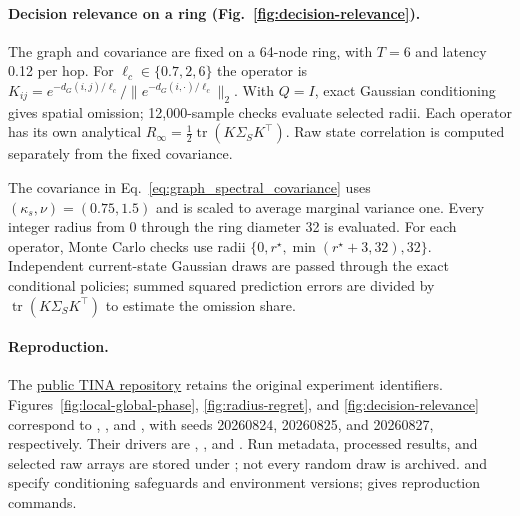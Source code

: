\paragraph{Decision relevance on a ring (Fig.~\ref{fig:decision-relevance}).}
The graph and covariance are fixed on a 64-node ring, with $T=6$ and latency
0.12 per hop. For $\ell_c\in\{0.7,2,6\}$ the operator is
$K_{ij}=e^{-d_G(i,j)/\ell_c}/\|e^{-d_G(i,\cdot)/\ell_c}\|_2$.
With $Q=I$, exact Gaussian conditioning gives spatial omission; 12,000-sample
checks evaluate selected radii. Each operator has its own analytical
$R_\infty=\tfrac12\operatorname{tr}(K\Sigma_S K^\top)$.
Raw state correlation is computed separately from the fixed covariance.

The covariance in Eq.~\eqref{eq:graph_spectral_covariance} uses
$(\kappa_s,\nu)=(0.75,1.5)$ and is scaled to average marginal variance one.
Every integer radius from 0 through the ring diameter 32 is evaluated.
For each operator, Monte Carlo checks use radii
$\{0,r^\star,\min(r^\star+3,32),32\}$. Independent current-state Gaussian
draws are passed through the exact conditional policies; summed squared
prediction errors are divided by $\operatorname{tr}(K\Sigma_SK^\top)$
to estimate the omission share.

\paragraph{Reproduction.}
The \href{https://github.com/ANRGUSC/TINA}{public TINA repository} retains
the original experiment identifiers. Figures~\ref{fig:local-global-phase},
\ref{fig:radius-regret}, and \ref{fig:decision-relevance} correspond to
,
, and
, with seeds 20260824, 20260825,
and 20260827, respectively. Their drivers are
,
, and
.
Run metadata, processed results, and selected raw arrays are stored under
; not every random draw is archived.
 and 
specify conditioning safeguards and environment versions;
 gives reproduction commands.
